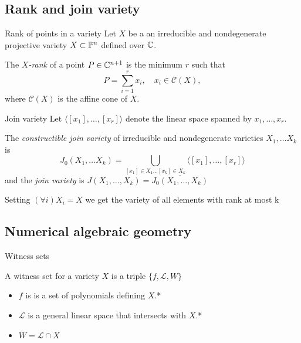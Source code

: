 \subsection{Rank and join variety}
\begin{frame}{Rank of points in a variety}
  Let $X$ be a an irreducible and nondegenerate projective variety $X \subset \mathbb{P}^n$ defined over $\mathbb{C}$.

  \begin{bee}[Definition]
    The \emph{$X$-rank} of a point $P \in \mathbb{C}^{n+1}$ is the minimum $r$ such that
    \[P = \sum_{i=1}^r x_i, \quad x_i \in \mathcal{C}(X),\]    
    where $\mathcal{C}(X)$ is the affine cone of $X$.
  \end{bee}
\end{frame}

\begin{frame}{Join variety}
  Let $\langle [x_1], \ldots, [x_r] \rangle$ denote the linear space spanned by $x_1, \ldots, x_r$.
  \begin{bee}[Definition]
    The \emph{constructible join variety} of irreducible and nondegenerate varieties $X_1, \ldots X_k$ is
      \[ J_0(X_1, \ldots X_k) = \bigcup_{[x_1] \in X_1 \ldots [x_k] \in X_k } \langle [x_1], \ldots, [x_r] \rangle \]
    and the \emph{join variety} is $J(X_1, \ldots, X_k) = \overline{J_0(X_1, \ldots, X_k)}$
  \end{bee}

  Setting $(\forall i) X_i = X$ we get the variety of all elements with rank at most k
\end{frame}

\subsection{Numerical algebraic geometry}

\begin{frame}{Witness sets}
  \begin{bee}
    A witness set for a variety $X$ is a triple $\{f, \mathcal{L}, W\}$
    \begin{itemize}
      \item $f$ is is a set of polynomials defining $X$.*
      \item $\mathcal{L}$ is a general linear space that intersects with $X$.*
      \item $W = \mathcal{L} \cap X$
    \end{itemize}
  \end{bee}
\end{frame}

